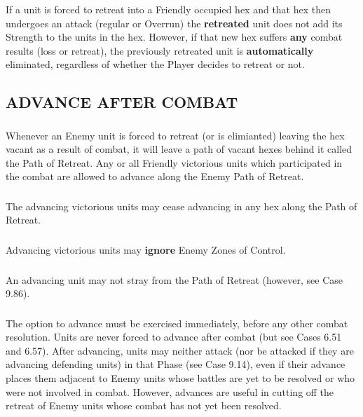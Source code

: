 \subsubsection{} If a unit is forced to retreat into a Friendly occupied hex and that hex then undergoes an attack (regular or Overrun) the \textbf{retreated} unit does not add its Strength to the units in the hex. However, if that new hex suffers \textbf{any} combat results (loss or retreat), the previously retreated unit is \textbf{automatically} eliminated, regardless of whether the Player decides to retreat or not.

\subsection{ADVANCE AFTER COMBAT}

\subsubsection{} Whenever an Enemy unit is forced to retreat (or is elimianted) leaving the hex vacant as a result of combat, it will leave a path of vacant hexes behind it called the Path of Retreat. Any or all Friendly victorious units which participated in the combat are allowed to advance along the Enemy Path of Retreat.

\subsubsection{} The advancing victorious units may cease advancing in any hex along the Path of Retreat.

\subsubsection{} Advancing victorious units may \textbf{ignore} Enemy Zones of Control.

\subsubsection{} An advancing unit may not stray from the Path of Retreat (however, see Case 9.86).

\subsubsection{} The option to advance must be exercised immediately, before any other combat resolution. Units are never forced to advance after combat (but see Cases 6.51 and 6.57). After advancing, units may neither attack (nor be attacked if they are advancing defending units) in that Phase (see Case 9.14), even if their advance places them adjacent to Enemy units whose battles are yet to be resolved or who were not involved in combat. However, advances are useful in cutting off the retreat of Enemy units whose combat has not yet been resolved.

